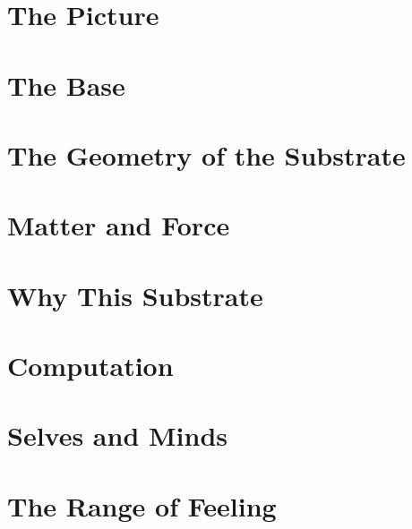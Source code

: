 \documentclass{article}
\begin{document}
\maketitle



\part{The Picture}


\part{The Base}




\part{The Geometry of the Substrate}





\part{Matter and Force}





\part{Why This Substrate}




\part{Computation}


\part{Selves and Minds}




\part{The Range of Feeling}


\end{document}
